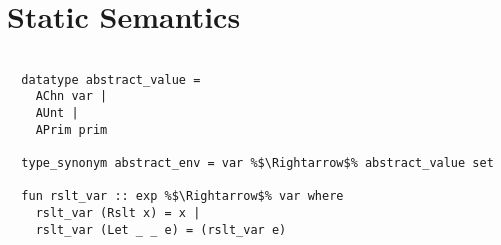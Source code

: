 \documentclass{article}
\begin{document}
\section{Static Semantics}
\begin{lstlisting}[style=codestyle1, escapechar=\%]

  datatype abstract_value =
    AChn var |
    AUnt |
    APrim prim

  type_synonym abstract_env = var %$\Rightarrow$% abstract_value set

  fun rslt_var :: exp %$\Rightarrow$% var where
    rslt_var (Rslt x) = x |
    rslt_var (Let _ _ e) = (rslt_var e)

  \end{lstlisting}
\begin{lstlisting}[style=codestyle1, escapechar=\%]



\end{lstlisting}
\end{document}

